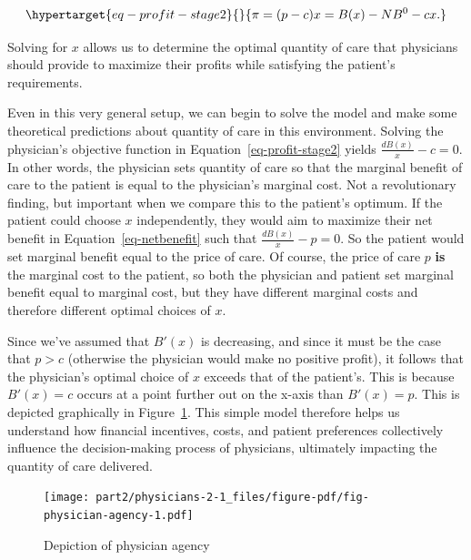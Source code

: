 \documentclass[
  letterpaper,
  DIV=11,
  numbers=noendperiod]{scrreport}
\theoremstyle{definition}
\theoremstyle{remark}
\begin{document}
\begin{equation}\protect\hypertarget{eq-profit-stage2}{}{\pi = (p-c)x = B(x) - NB^{0} - cx.}\label{eq-profit-stage2}\end{equation}

Solving for \(x\) allows us to determine the optimal quantity of care
that physicians should provide to maximize their profits while
satisfying the patient's requirements.

Even in this very general setup, we can begin to solve the model and
make some theoretical predictions about quantity of care in this
environment. Solving the physician's objective function in
Equation~\ref{eq-profit-stage2} yields \(\frac{d B(x)}{x} - c =0\). In
other words, the physician sets quantity of care so that the marginal
benefit of care to the patient is equal to the physician's marginal
cost. Not a revolutionary finding, but important when we compare this to
the patient's optimum. If the patient could choose \(x\) independently,
they would aim to maximize their net benefit in
Equation~\ref{eq-netbenefit} such that \(\frac{ d B(x)}{x} - p =0\). So
the patient would set marginal benefit equal to the price of care. Of
course, the price of care \(p\) \textbf{is} the marginal cost to the
patient, so both the physician and patient set marginal benefit equal to
marginal cost, but they have different marginal costs and therefore
different optimal choices of \(x\).

Since we've assumed that \(B'(x)\) is decreasing, and since it must be
the case that \(p>c\) (otherwise the physician would make no positive
profit), it follows that the physician's optimal choice of \(x\) exceeds
that of the patient's. This is because \(B'(x)=c\) occurs at a point
further out on the x-axis than \(B'(x)=p\). This is depicted graphically
in Figure~\ref{fig-physician-agency}. This simple model therefore helps
us understand how financial incentives, costs, and patient preferences
collectively influence the decision-making process of physicians,
ultimately impacting the quantity of care delivered.

\begin{figure}

{\centering \texttt{[image: part2/physicians-2-1\_files/figure-pdf/fig-physician-agency-1.pdf]}

}

\caption{\label{fig-physician-agency}Depiction of physician agency}

\end{figure}
\end{document}
